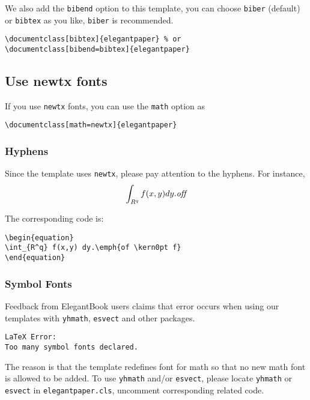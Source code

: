 \documentclass[11pt,en]{elegantpaper}
\begin{document}
We also add the \lstinline{bibend} option to this template, you can choose \lstinline{biber} (default) or \lstinline{bibtex} as you like, \lstinline{biber} is recommended.

\begin{lstlisting}
\documentclass[bibtex]{elegantpaper} % or
\documentclass[bibend=bibtex]{elegantpaper}
\end{lstlisting}



\subsection{Use newtx fonts}
If you use \lstinline{newtx} fonts, you can use the \lstinline{math} option as 
\begin{lstlisting}
\documentclass[math=newtx]{elegantpaper}
\end{lstlisting}


\subsubsection{Hyphens}
Since the template uses \lstinline{newtx}, please pay attention to the hyphens. For instance,
\begin{equation}
\int_{R^q} f(x,y) dy.\emph{of\kern0pt f}
\end{equation}

The corresponding code is: 
\begin{lstlisting}
\begin{equation}
\int_{R^q} f(x,y) dy.\emph{of \kern0pt f}
\end{equation}
\end{lstlisting}

\subsubsection{Symbol Fonts}
Feedback from ElegantBook users claims that error occurs when using our templates with  \lstinline{yhmath}, \lstinline{esvect} and other packages.
\begin{lstlisting}
LaTeX Error:
Too many symbol fonts declared.
\end{lstlisting}

The reason is that the template redefines font for math so that no new math font is allowed to be added. To use \lstinline{yhmath} and/or \lstinline{esvect}, please locate \lstinline{yhmath} or \lstinline{esvect} in \lstinline{elegantpaper.cls}, uncomment corresponding related code.
\end{document}
